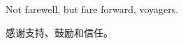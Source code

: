 \begin{acknowledgement}

  Not farewell, but fare forward, voyagers.

  感谢支持、鼓励和信任。

\end{acknowledgement}
